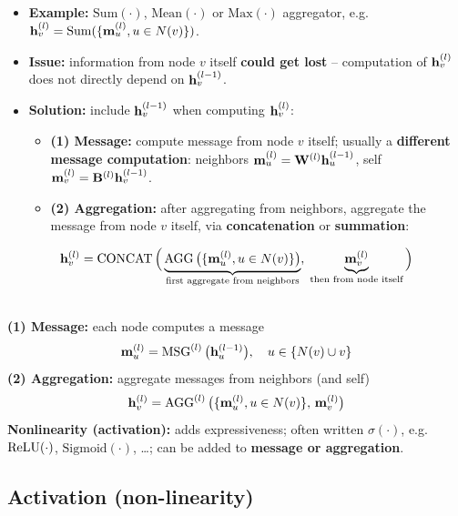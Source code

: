 \begin{itemize}
  \item[] \textbf{Example:} $\mathrm{Sum}(\cdot)$, $\mathrm{Mean}(\cdot)$ or
    $\mathrm{Max}(\cdot)$ aggregator, e.g.\
    $\mathbf{h}_v^{(l)}=\mathrm{Sum}(\{\mathbf{m}_u^{(l)}, u\in N(v)\})$.
  \item \textbf{Issue:} information from node $v$ itself \textbf{could get
    lost} -- computation of $\mathbf{h}_v^{(l)}$ does not directly depend on
    $\mathbf{h}_v^{(l-1)}$.
  \item \textbf{Solution:} include $\mathbf{h}_v^{(l-1)}$ when computing $\mathbf{h}_v^{(l)}$:
    \begin{itemize}
      \item \textbf{(1) Message:} compute message from node $v$ itself; usually a
        \textbf{different message computation}: neighbors
        $\mathbf{m}_u^{(l)}=\mathbf{W}^{(l)}\mathbf{h}_u^{(l-1)}$, self
        $\mathbf{m}_v^{(l)}=\mathbf{B}^{(l)}\mathbf{h}_v^{(l-1)}$.
      \item \textbf{(2) Aggregation:} after aggregating from neighbors,
        aggregate the message from node $v$ itself, via
        \textbf{concatenation} or \textbf{summation}:
    \end{itemize}
\end{itemize}
\begin{equation}\label{eq:lec04-self}
  \mathbf{h}_v^{(l)} = \operatorname{CONCAT}\Big(\underbrace{\operatorname{AGG}\big(\{\mathbf{m}_u^{(l)}, u\in N(v)\}\big)}_{\text{first aggregate from neighbors}},\;
  \underbrace{\mathbf{m}_v^{(l)}}_{\text{then from node itself}}\Big)
\end{equation}

\begin{definition} [A single GNN layer]\label{def:lec04-layer} 
\leavevmode\\
  \textbf{(1) Message:} each node computes a message
  \[
    \mathbf{m}_u^{(l)} = \operatorname{MSG}^{(l)}\big(\mathbf{h}_u^{(l-1)}\big),\quad u\in\{N(v)\cup v\}
  \]
  \textbf{(2) Aggregation:} aggregate messages from neighbors (and self)
  \[
    \mathbf{h}_v^{(l)} = \operatorname{AGG}^{(l)}\big(\{\mathbf{m}_u^{(l)}, u\in N(v)\},\,\mathbf{m}_v^{(l)}\big)
  \]
  \textbf{Nonlinearity (activation):} adds expressiveness; often written
  $\sigma(\cdot)$, e.g.\ $\operatorname{ReLU}(\cdot)$, $\mathrm{Sigmoid}(\cdot)$, \dots; can be
  added to \textbf{message or aggregation}.
\end{definition}

\subsection{Activation (non-linearity)}\label{sec:lec04-act}

